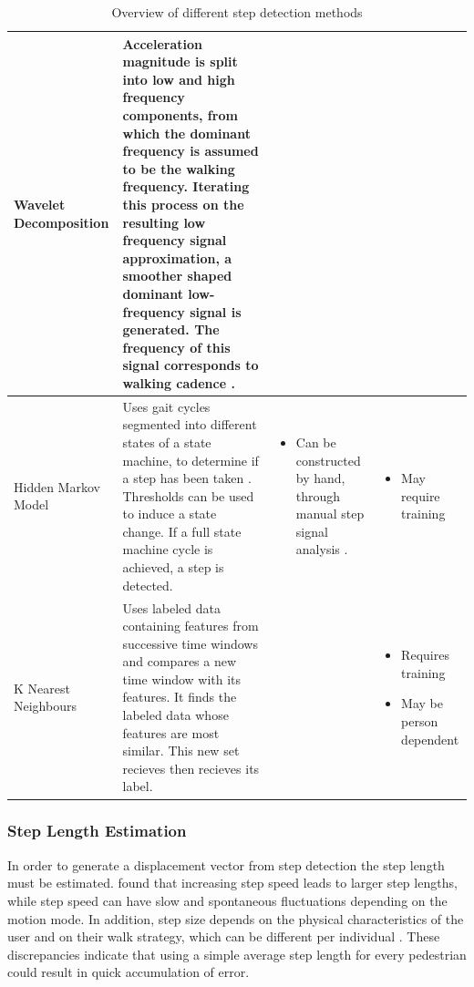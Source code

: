 \begin{landscape}
\begin{table}[h]
\begin{tabularx}{\linewidth}{@{} P{17mm} P{95mm} L L@{}}
  Wavelet Decomposition & Acceleration magnitude is split into low and high frequency components, from which the dominant frequency is assumed to be the walking frequency. Iterating this process on the resulting low frequency signal approximation, a smoother shaped dominant low-frequency signal is generated. The frequency of this signal corresponds to walking cadence \cite{Davidson2017}. & & \\ \hline	
  Hidden Markov Model & Uses gait cycles segmented into different states of a state machine, to determine if a step has been taken \cite{Ren2016a}. Thresholds can be used to induce a state change. If a full state machine cycle is achieved, a step is detected.  &
  \begin{itemize}[noitemsep,topsep=-10pt]
  	\item Can be constructed by hand, through manual step signal analysis \cite{Ren2016a}.
  \end{itemize} \nointerlineskip & 
  \begin{itemize}[noitemsep,topsep=-10pt]
  	\item May require training
  \end{itemize}\nointerlineskip  \\ \hline
  K Nearest Neighbours & Uses labeled data containing features from successive time windows and compares a new time window with its features. It finds the labeled data whose features are most similar. This new set recieves then recieves its label. & & 
  \begin{itemize}[noitemsep,topsep=-10pt]
  	\item Requires training
  	\item May be person dependent 
  \end{itemize} \nointerlineskip \\ 
			\bottomrule
		\end{tabularx}
		\caption{Overview of different step detection methods}
		\label{tab:step_detection_comparison}
	\end{table}
\restoregeometry
\end{landscape}

\subsubsection{Step Length Estimation}
In order to generate a displacement vector from step detection the step length must be estimated. \citet{Collins2013a} found that increasing step speed leads to larger step lengths, while step speed can have slow and spontaneous fluctuations depending on the motion mode. In addition, step size depends on the physical characteristics of the user and on their walk strategy, which can be different per individual \cite{Diez2018}. These discrepancies indicate that using a simple average step length for every pedestrian could result in quick accumulation of error. 

